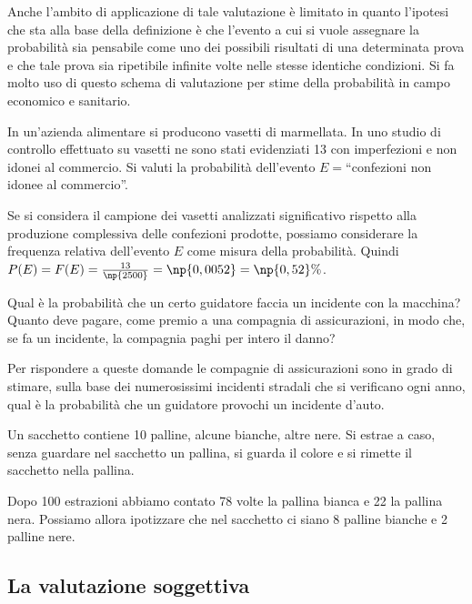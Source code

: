 Anche l'ambito di applicazione di tale valutazione è limitato in quanto l'ipotesi che sta alla base della definizione è che l'evento a cui si vuole assegnare la probabilità sia pensabile come uno dei possibili risultati di una determinata prova e che tale prova sia ripetibile infinite volte nelle stesse identiche condizioni.
Si fa molto uso di questo schema di valutazione per stime della probabilità in campo economico e sanitario.

\begin{exrig}
\begin{esempio}
In un'azienda alimentare si producono vasetti di marmellata. In uno studio di controllo effettuato su  vasetti ne sono stati evidenziati 13 con imperfezioni e non idonei al commercio. Si valuti la probabilità dell'evento $E=$``confezioni non idonee al commercio''.

Se si considera il campione dei vasetti analizzati significativo rispetto alla produzione complessiva delle confezioni prodotte, possiamo considerare la frequenza relativa dell'evento $E$ come misura della probabilità. Quindi $P(E)=F(E)=\frac{13}{\np{2500}}=\np{0,0052}=\np{0,52}\%$.
\end{esempio}

\begin{esempio}
Qual è la probabilità che un certo guidatore faccia un incidente con la macchina? Quanto deve pagare, come premio a una compagnia di assicurazioni, in modo che, se fa un incidente, la compagnia paghi per intero il danno?

Per rispondere a queste domande le compagnie di assicurazioni sono in grado di stimare, sulla base dei numerosissimi incidenti stradali che si verificano ogni anno, qual è la probabilità che un guidatore provochi un incidente d'auto.
\end{esempio}

\begin{esempio}
Un sacchetto contiene 10 palline, alcune bianche, altre nere. Si estrae a caso, senza guardare nel sacchetto un pallina, si guarda il colore e si rimette il sacchetto nella pallina.

Dopo 100 estrazioni abbiamo contato 78 volte la pallina bianca e 22 la pallina nera. Possiamo allora ipotizzare che nel sacchetto ci siano 8 palline bianche e 2 palline nere.
\end{esempio}
\end{exrig}

\subsection{La valutazione soggettiva}

